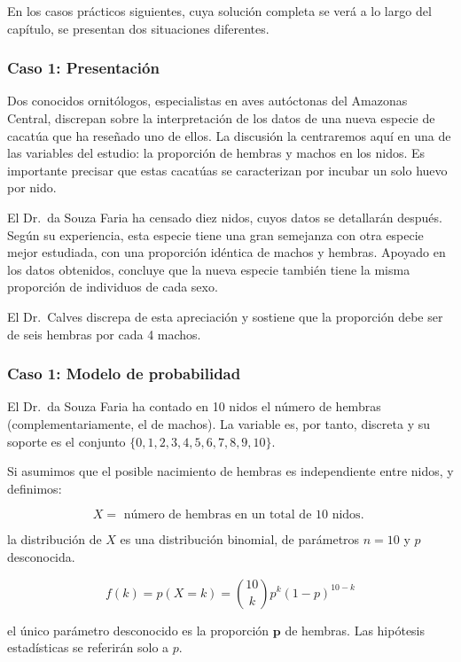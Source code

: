 \documentclass[
]{article}
\begin{document}
En los casos prácticos siguientes, cuya solución completa se verá a lo largo del capítulo, se presentan dos situaciones diferentes.

\subsubsection{Caso 1: Presentación}\label{caso-1-presentaciuxf3n}

Dos conocidos ornitólogos, especialistas en aves autóctonas del Amazonas Central, discrepan sobre la interpretación de los datos de una nueva especie de cacatúa que ha reseñado uno de ellos. La discusión la centraremos aquí en una de las variables del estudio: la proporción de hembras y machos en los nidos. Es importante precisar que estas cacatúas se caracterizan por incubar un solo huevo por nido.

El Dr.~da Souza Faria ha censado diez nidos, cuyos datos se detallarán después. Según su experiencia, esta especie tiene una gran semejanza con otra especie mejor estudiada, con una proporción idéntica de machos y hembras. Apoyado en los datos obtenidos, concluye que la nueva especie también tiene la misma proporción de individuos de cada sexo.

El Dr.~Calves discrepa de esta apreciación y sostiene que la proporción debe ser de seis hembras por cada 4 machos.

\subsubsection{Caso 1: Modelo de probabilidad}\label{caso-1-modelo-de-probabilidad}

El Dr.~da Souza Faria ha contado en 10 nidos el número de hembras (complementariamente, el de machos). La variable es, por tanto, discreta y su soporte es el conjunto \(\{0,1,2,3,4,5,6,7,8,9,10\}\).

Si asumimos que el posible nacimiento de hembras es independiente entre nidos, y definimos:

\[
X=\text { número de hembras en un total de } 10 \text { nidos. }
\]

la distribución de \(X\) es una distribución binomial, de parámetros \(n=10\) y \(p\) desconocida.

\[
f(k)=p(X=k)=\binom{10}{k} p^{k}(1-p)^{10-k}
\]

el único parámetro desconocido es la proporción \(\boldsymbol{p}\) de hembras. Las hipótesis estadísticas se referirán solo a \(p\).
\end{document}

